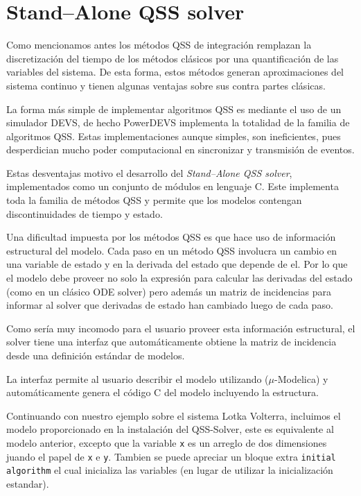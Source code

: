 \section{Stand–Alone QSS solver}
	Como mencionamos antes los métodos QSS de integración remplazan la discretización del tiempo de los métodos clásicos por una quantificación de las 
	variables del sistema. De esta forma, estos métodos generan aproximaciones del sistema continuo y tienen algunas ventajas sobre sus contra partes clásicas.

	La forma más simple de implementar algoritmos QSS es mediante el uso de un simulador DEVS, de hecho PowerDEVS implementa la totalidad de la familia de 
	algoritmos QSS. Estas implementaciones aunque simples, son ineficientes, pues desperdician mucho poder computacional en sincronizar y transmisión de eventos.

	Estas desventajas motivo el desarrollo del \emph{Stand–Alone QSS solver}\cite{Ber12}, implementados como un conjunto de módulos en lenguaje C. Este implementa 
	toda la familia de métodos QSS y permite que los modelos contengan discontinuidades de tiempo y estado.

	Una dificultad impuesta por los métodos QSS es que hace uso de información estructural del modelo. Cada paso en un método QSS involucra un cambio 
	en una variable de estado y en la derivada del estado que depende de el. Por lo que el modelo debe proveer no solo la expresión para calcular las 
	derivadas del estado (como en un clásico ODE solver) pero además un matriz de incidencias para informar al solver que derivadas de estado han cambiado 
	luego de cada paso.

	Como sería muy incomodo para el usuario proveer esta información estructural, el solver tiene una interfaz que automáticamente obtiene la matriz de
	 incidencia desde una definición estándar de modelos.

	La interfaz permite al usuario describir el modelo utilizando ($\mu$-Modelica) y automáticamente genera el código C del modelo incluyendo la estructura.

	Continuando con nuestro ejemplo sobre el sistema Lotka Volterra, incluimos el modelo proporcionado en la instalación del QSS-Solver, este es equivalente 
	al modelo anterior, excepto que la variable \texttt{x} es un arreglo de dos dimensiones juando el papel de \texttt{x} e \texttt{y}.
	Tambien se puede apreciar un bloque extra \texttt{initial algorithm} el cual inicializa las variables (en lugar de utilizar la inicialización estandar).

